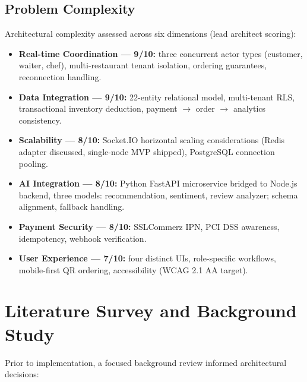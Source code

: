 \subsection{Problem Complexity}

Architectural complexity assessed across six dimensions (lead architect scoring):

\begin{itemize}
\item \textbf{Real-time Coordination --- 9/10:} three concurrent actor types (customer, waiter, chef), multi-restaurant tenant isolation, ordering guarantees, reconnection handling.
\item \textbf{Data Integration --- 9/10:} 22-entity relational model, multi-tenant RLS, transactional inventory deduction, payment $\rightarrow$ order $\rightarrow$ analytics consistency.
\item \textbf{Scalability --- 8/10:} Socket.IO horizontal scaling considerations (Redis adapter discussed, single-node MVP shipped), PostgreSQL connection pooling.
\item \textbf{AI Integration --- 8/10:} Python FastAPI microservice bridged to Node.js backend, three models: recommendation, sentiment, review analyzer; schema alignment, fallback handling.
\item \textbf{Payment Security --- 8/10:} SSLCommerz IPN, PCI DSS awareness, idempotency, webhook verification.
\item \textbf{User Experience --- 7/10:} four distinct UIs, role-specific workflows, mobile-first QR ordering, accessibility (WCAG 2.1 AA target).
\end{itemize}

\section{Literature Survey and Background Study}
\label{sec:literature}

Prior to implementation, a focused background review informed architectural decisions:

